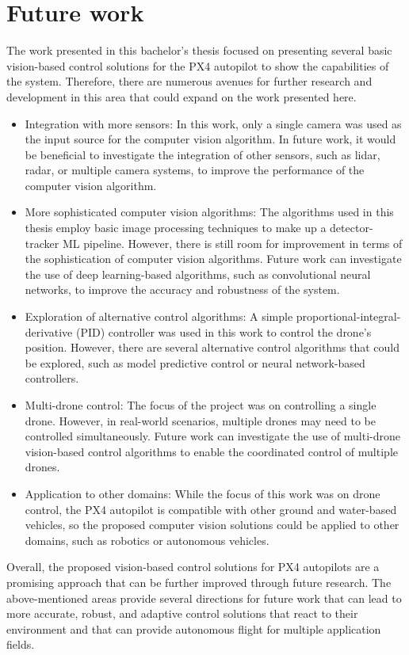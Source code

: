 \section{Future work}
\label{sec:fut-work}

The work presented in this bachelor's thesis focused on presenting several basic vision-based control solutions for the PX4 autopilot to show the capabilities of the system. Therefore, there are numerous avenues for further research and development in this area that could expand on the work presented here.

\begin{itemize}
    \item Integration with more sensors: In this work, only a single camera was used as the input source for the computer vision algorithm. In future work, it would be beneficial to investigate the integration of other sensors, such as lidar, radar, or multiple camera systems, to improve the performance of the computer vision algorithm.

    \item More sophisticated computer vision algorithms: The algorithms used in this thesis employ basic image processing techniques to make up a detector-tracker ML pipeline. However, there is still room for improvement in terms of the sophistication of computer vision algorithms. Future work can investigate the use of deep learning-based algorithms, such as convolutional neural networks, to improve the accuracy and robustness of the system.

    \item Exploration of alternative control algorithms: A simple proportional-integral-derivative (PID) controller was used in this work to control the drone's position. However, there are several alternative control algorithms that could be explored, such as model predictive control or neural network-based controllers.

    \item Multi-drone control: The focus of the project was on controlling a single drone. However, in real-world scenarios, multiple drones may need to be controlled simultaneously. Future work can investigate the use of multi-drone vision-based control algorithms to enable the coordinated control of multiple drones.

    \item Application to other domains: While the focus of this work was on drone control, the PX4 autopilot is compatible with other ground and water-based vehicles, so the proposed computer vision solutions could be applied to other domains, such as robotics or autonomous vehicles.
\end{itemize}

Overall, the proposed vision-based control solutions for PX4 autopilots are a promising approach that can be further improved through future research. The above-mentioned areas provide several directions for future work that can lead to more accurate, robust, and adaptive control solutions that react to their environment and that can provide autonomous flight for multiple application fields.
